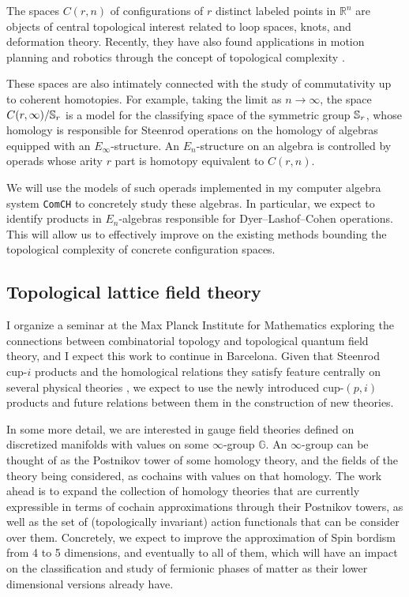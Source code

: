 The spaces $C(r,n)$ of configurations of $r$ distinct labeled points in $\mathbb R^n$ are objects of central topological interest related to loop spaces, knots, and deformation theory.
Recently, they have also found applications in motion planning and robotics through the concept of topological complexity \cite{farber2003motion-planning}.

These spaces are also intimately connected with the study of commutativity up to coherent homotopies.
For example, taking the limit as $n \to \infty$, the space $C(r, \infty)/\S_r$ is a model for the classifying space of the symmetric group $\S_r$, whose homology is responsible for Steenrod operations on the homology of algebras equipped with an $E_\infty$-structure.
An $E_n$-structure on an algebra is controlled by operads whose arity $r$ part is homotopy equivalent to $C(r,n)$.

We will use the models of such operads implemented in my computer algebra system \texttt{ComCH} \cite{medina2021computer} to concretely study these algebras.
In particular, we expect to identify products in $E_n$-algebras responsible for Dyer--Lashof--Cohen operations.
This will allow us to effectively improve on the existing methods bounding the topological complexity of concrete configuration spaces.

\subsection{Topological lattice field theory} \label{ss:physics}

I organize a seminar at the Max Planck Institute for Mathematics exploring the connections between combinatorial topology and topological quantum field theory, and I expect this work to continue in Barcelona.
Given that Steenrod cup-$i$ products and the homological relations they satisfy feature centrally on several physical theories \cite{gaiotto2016spin, kapustin2017fermionic}, we expect to use the newly introduced cup-$(p,i)$ products and future relations between them in the construction of new theories.

In some more detail, we are interested in gauge field theories defined on discretized manifolds with values on some $\infty$-group $\mathbb G$.
An $\infty$-group can be thought of as the Postnikov tower of some homology theory, and the fields of the theory being considered, as cochains with values on that homology.
The work ahead is to expand the collection of homology theories that are currently expressible in terms of cochain approximations through their Postnikov towers, as well as the set of (topologically invariant) action functionals that can be consider over them.
Concretely, we expect to improve the approximation of Spin bordism from 4 to 5 dimensions, and eventually to all of them, which will have an impact on the classification and study of fermionic phases of matter as their lower dimensional versions already have.

